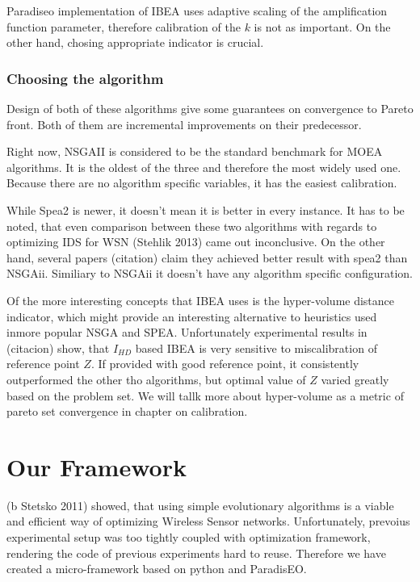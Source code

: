\documentclass[12pt,oneside,draft]{fithesis2}
\begin{document}
Paradiseo implementation of IBEA uses adaptive scaling of the amplification function parameter, therefore calibration of the $k$ is not as important. On the other hand, chosing appropriate indicator is crucial.


\subsection{Choosing the algorithm}
Design of both of these algorithms give some guarantees on convergence to Pareto front. Both of them are incremental improvements on their predecessor. 

Right now, NSGAII is considered to be the standard benchmark for MOEA algorithms. It is the oldest of the three and therefore the most widely used one. Because there are no algorithm specific variables, it has the easiest calibration.
       
       While Spea2 is newer, it doesn't mean it is better in every instance. It has to be noted, that even comparison between these two algorithms with regards to optimizing IDS for WSN (Stehlik 2013) came out inconclusive. On the other hand, several papers (citation) claim they achieved better result with spea2 than NSGAii. Similiary to NSGAii it doesn't have any algorithm specific configuration.  

Of the more interesting concepts that IBEA uses is the hyper-volume distance indicator, which might provide an interesting alternative to heuristics used inmore popular NSGA and SPEA. Unfortunately experimental results in (citacion) show, that $I_{HD}$ based IBEA is very sensitive to miscalibration of reference point $Z$. If provided with good reference point, it consistently outperformed the other tho algorithms, but optimal value of $Z$ varied greatly based on the problem set. We will tallk more about hyper-volume as a metric of pareto set convergence in chapter on calibration.


\chapter{Our Framework}

(b Stetsko 2011) showed, that using simple evolutionary algorithms is a viable and efficient way of optimizing Wireless Sensor networks. Unfortunately, prevoius experimental setup was too tightly coupled with optimization framework, rendering the code of previous experiments hard to reuse. Therefore we have created a micro-framework based on python and ParadisEO. 
\end{document}
